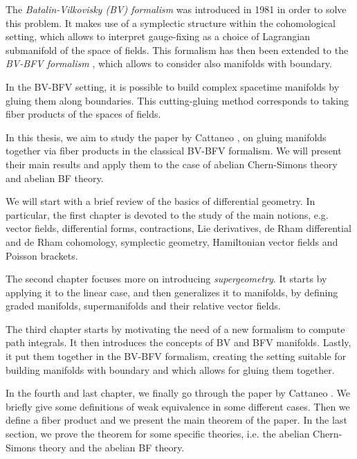 The \emph{Batalin-Vilkovisky (BV) formalism} \cite{BV_1, BV_2} was introduced in 1981 in order to solve this problem.
It makes use of a symplectic structure within the cohomological setting, which allows to interpret gauge-fixing as a choice of Lagrangian submanifold of the space of fields.
This formalism has then been extended to the \emph{BV-BFV formalism} \cite{Mnfd_boundaries, mCME, Intro_BV-BFV}, which allows to consider also manifolds with boundary.

In the BV-BFV setting, it is possible to build complex spacetime manifolds by gluing them along boundaries.
This cutting-gluing method corresponds to taking fiber products of the spaces of fields.


In this thesis, we aim to study the paper by Cattaneo \etal \cite{Gluing_BV-BFV}, on gluing manifolds together via fiber products in the classical BV-BFV formalism.
We will present their main results and apply them to the case of abelian Chern-Simons theory and abelian BF theory.



We will start with a brief review of the basics of differential geometry.
In particular, the first chapter is devoted to the study of the main notions, e.g. vector fields, differential forms, contractions, Lie derivatives, de Rham differential and de Rham cohomology, symplectic geometry, Hamiltonian vector fields and Poisson brackets.

The second chapter focuses more on introducing \emph{supergeometry}.
It starts by applying it to the linear case, and then generalizes it to manifolds, by defining graded manifolds, supermanifolds and their relative vector fields.

The third chapter starts by motivating the need of a new formalism to compute path integrals.
It then introduces the concepts of BV and BFV manifolds.
Lastly, it put them together in the BV-BFV formalism, creating the setting suitable for building manifolds with boundary and which allows for gluing them together.

In the fourth and last chapter, we finally go through the paper by Cattaneo \etal \cite{Gluing_BV-BFV}.
We briefly give some definitions of weak equivalence in some different cases.
Then we define a fiber product and we present the main theorem of the paper.
In the last section, we prove the theorem for some specific theories, i.e. the abelian Chern-Simons theory and the abelian BF theory.